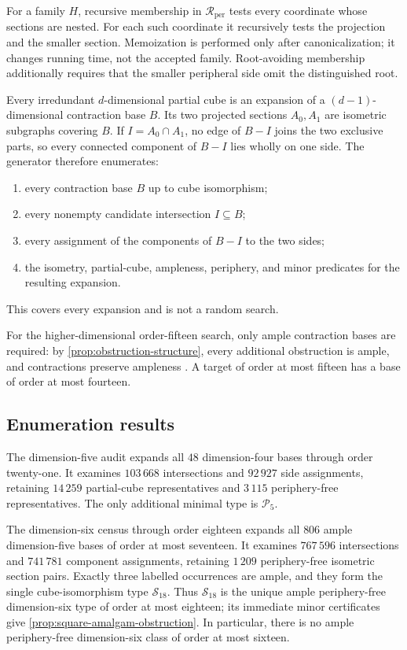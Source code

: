 \documentclass[11pt]{article}
\theoremstyle{definition}
\theoremstyle{remark}
\newcommand{\Rper}{\mathcal R_{\mathrm{per}}}
\begin{document}
For a family \(H\), recursive membership in \(\Rper\) tests every coordinate
whose sections are nested.  For each such coordinate it recursively tests
the projection and the smaller section.  Memoization is performed only after
canonicalization; it changes running time, not the accepted family.
Root-avoiding membership additionally requires that the smaller peripheral
side omit the distinguished root.

Every irredundant \(d\)-dimensional partial cube is an expansion of a
\((d-1)\)-dimensional contraction base \(B\).  Its two projected sections
\(A_0,A_1\) are isometric subgraphs covering \(B\).  If
\(I=A_0\cap A_1\), no edge of \(B-I\) joins the two exclusive parts, so every
connected component of \(B-I\) lies wholly on one side.  The generator
therefore enumerates:
\begin{enumerate}
  \item every contraction base \(B\) up to cube isomorphism;
  \item every nonempty candidate intersection \(I\subseteq B\);
  \item every assignment of the components of \(B-I\) to the two sides;
  \item the isometry, partial-cube, ampleness, periphery, and minor
        predicates for the resulting expansion.
\end{enumerate}
This covers every expansion and is not a random search.

For the higher-dimensional order-fifteen search, only ample contraction
bases are required: by \cref{prop:obstruction-structure}, every additional
obstruction is ample, and contractions preserve ampleness
\cite{BandeltCDK06,KnauerMarc20}.  A target of order at most fifteen has a
base of order at most fourteen.

\subsection{Enumeration results}

The dimension-five audit expands all \(48\) dimension-four bases through
order twenty-one.  It examines \(103\,668\) intersections and \(92\,927\)
side assignments, retaining \(14\,259\) partial-cube representatives and
\(3\,115\) periphery-free representatives.  The only additional minimal
type is \(\mathcal P_5\).

The dimension-six census through order eighteen expands all
\(806\) ample dimension-five bases of order at most seventeen.  It examines
\(767\,596\) intersections and \(741\,781\) component assignments, retaining
\(1\,209\) periphery-free isometric section pairs.  Exactly three labelled
occurrences are ample, and they form the single cube-isomorphism type
\(\mathcal S_{18}\).  Thus \(\mathcal S_{18}\) is the unique ample
periphery-free dimension-six type of order at most eighteen; its immediate
minor certificates give \cref{prop:square-amalgam-obstruction}.
In particular, there is no ample periphery-free dimension-six class of
order at most sixteen.
\end{document}
